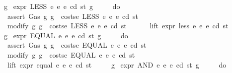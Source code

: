 \begin{isabellebody}
\ \ \ \ {\isacharbraceright}{\kern0pt}{\isacharparenright}{\kern0pt}\ g{\isachardoublequoteclose}\isanewline
{\isacharbar}{\kern0pt}\ {\isachardoublequoteopen}expr\ {\isacharparenleft}{\kern0pt}LESS\ e{}\ e{}{\isacharparenright}{\kern0pt}\ e\ cd\ st\ g\ {\isacharequal}{\kern0pt}\isanewline
\ \ \ \ {\isacharparenleft}{\kern0pt}do\ {\isacharbraceleft}{\kern0pt}\isanewline
\ \ \ \ \ \ assert\ Gas\ {\isacharparenleft}{\kern0pt}{\isasymlambda}g{\isachardot}{\kern0pt}\ g\ {\isachargreater}{\kern0pt}\ costs\isactrlsub e\ {\isacharparenleft}{\kern0pt}LESS\ e{}\ e{}{\isacharparenright}{\kern0pt}\ e\ cd\ st{\isacharparenright}{\kern0pt}{\isacharsemicolon}{\kern0pt}\isanewline
\ \ \ \ \ \ modify\ {\isacharparenleft}{\kern0pt}{\isasymlambda}g{\isachardot}{\kern0pt}\ g\ {\isacharminus}{\kern0pt}\ costs\isactrlsub e\ {\isacharparenleft}{\kern0pt}LESS\ e{}\ e{}{\isacharparenright}{\kern0pt}\ e\ cd\ st{\isacharparenright}{\kern0pt}{\isacharsemicolon}{\kern0pt}\isanewline
\ \ \ \ \ \ lift\ expr\ less\ e{}\ e{}\ e\ cd\ st\isanewline
\ \ \ \ {\isacharbraceright}{\kern0pt}{\isacharparenright}{\kern0pt}\ g{\isachardoublequoteclose}\isanewline
{\isacharbar}{\kern0pt}\ {\isachardoublequoteopen}expr\ {\isacharparenleft}{\kern0pt}EQUAL\ e{}\ e{}{\isacharparenright}{\kern0pt}\ e\ cd\ st\ g\ {\isacharequal}{\kern0pt}\isanewline
\ \ \ \ {\isacharparenleft}{\kern0pt}do\ {\isacharbraceleft}{\kern0pt}\isanewline
\ \ \ \ \ \ assert\ Gas\ {\isacharparenleft}{\kern0pt}{\isasymlambda}g{\isachardot}{\kern0pt}\ g\ {\isachargreater}{\kern0pt}\ costs\isactrlsub e\ {\isacharparenleft}{\kern0pt}EQUAL\ e{}\ e{}{\isacharparenright}{\kern0pt}\ e\ cd\ st{\isacharparenright}{\kern0pt}{\isacharsemicolon}{\kern0pt}\isanewline
\ \ \ \ \ \ modify\ {\isacharparenleft}{\kern0pt}{\isasymlambda}g{\isachardot}{\kern0pt}\ g\ {\isacharminus}{\kern0pt}\ costs\isactrlsub e\ {\isacharparenleft}{\kern0pt}EQUAL\ e{}\ e{}{\isacharparenright}{\kern0pt}\ e\ cd\ st{\isacharparenright}{\kern0pt}{\isacharsemicolon}{\kern0pt}\isanewline
\ \ \ \ \ \ lift\ expr\ equal\ e{}\ e{}\ e\ cd\ st\isanewline
\ \ \ \ {\isacharbraceright}{\kern0pt}{\isacharparenright}{\kern0pt}\ g{\isachardoublequoteclose}\isanewline
{\isacharbar}{\kern0pt}\ {\isachardoublequoteopen}expr\ {\isacharparenleft}{\kern0pt}AND\ e{}\ e{}{\isacharparenright}{\kern0pt}\ e\ cd\ st\ g\ {\isacharequal}{\kern0pt}\isanewline
\ \ \ \ {\isacharparenleft}{\kern0pt}do\ {\isacharbraceleft}{\kern0pt}\isanewline

\end{isabellebody}
